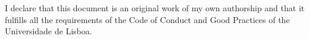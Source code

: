 \hspace{0.4cm} I declare that this document is an original work of my own authorship and that it fulfills all the requirements of the Code of Conduct and Good Practices of the Universidade de Lisboa. 
